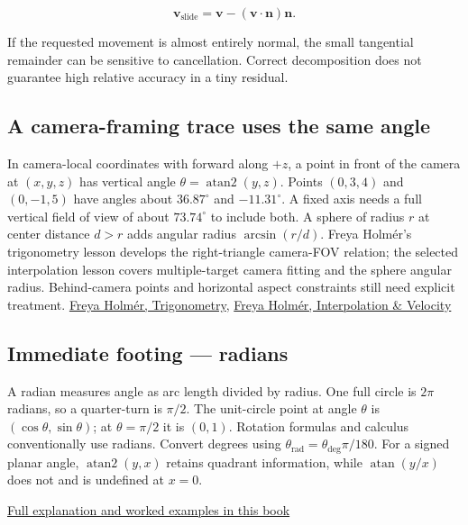 \[
\mathbf v_{\mathrm{slide}}=\mathbf v-(\mathbf v\cdot\mathbf n)\mathbf n.
\]

If the requested movement is almost entirely normal, the small tangential remainder can be sensitive to cancellation. Correct decomposition does not guarantee high relative accuracy in a tiny residual.

\subsection{A camera-framing trace uses the same angle}\label{01-foundations-i-ch017-a-camera-framing-trace-uses-the-same-angle}

In camera-local coordinates with forward along \(+z\), a point in front of the camera at \((x,y,z)\) has vertical angle \(\theta=\operatorname{atan2}(y,z)\). Points \((0,3,4)\) and \((0,-1,5)\) have angles about \(36.87^\circ\) and \(-11.31^\circ\). A fixed axis needs a full vertical field of view of about \(73.74^\circ\) to include both. A sphere of radius \(r\) at center distance \(d>r\) adds angular radius \(\arcsin(r/d)\). Freya Holmér's trigonometry lesson develops the right-triangle camera-FOV relation; the selected interpolation lesson covers multiple-target camera fitting and the sphere angular radius. Behind-camera points and horizontal aspect constraints still need explicit treatment. \href{https://www.youtube.com/watch?v=1NLekEd770w}{Freya Holmér, Trigonometry}, \href{https://www.youtube.com/watch?v=-Ii3MrJFBkQ}{Freya Holmér, Interpolation \& Velocity}

\subsection{Immediate footing --- radians}\label{01-foundations-i-ch017-immediate-footing-radians}

A radian measures angle as arc length divided by radius. One full circle is \(2\pi\) radians, so a quarter-turn is \(\pi/2\). The unit-circle point at angle \(\theta\) is \((\cos\theta,\sin\theta)\); at \(\theta=\pi/2\) it is \((0,1)\). Rotation formulas and calculus conventionally use radians. Convert degrees using \(\theta_{\mathrm{rad}}=\theta_{\mathrm{deg}}\pi/180\). For a signed planar angle, \(\operatorname{atan2}(y,x)\) retains quadrant information, while \(\operatorname{atan}(y/x)\) does not and is undefined at \(x=0\).

\hyperref[01-foundations-i-ch017-rotation-first-becomes-understandable-in-a-plane]{Full explanation and worked examples in this book}

